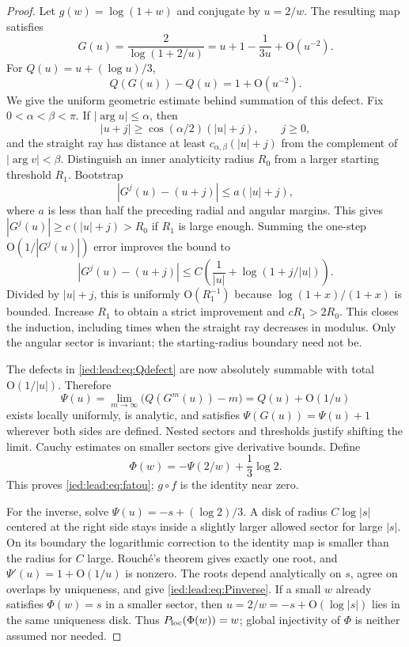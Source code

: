 \documentclass[11pt,letterpaper]{article}
\theoremstyle{remark}\newtheorem{remark}[theorem]{Remark}
\newcommand{\Oh}{\mathrm O}\newcommand{\supp}{\operatorname{supp}}
\begin{document}
\begin{proof}
Let $g(w)=\log(1+w)$ and conjugate by $u=2/w$. The resulting map satisfies
\[
 G(u)=\frac2{\log(1+2/u)}=u+1-\frac1{3u}+\Oh(u^{-2}).
\]
For $Q(u)=u+(\log u)/3$,
\begin{equation}\label{ied:lead:eq:Qdefect}
 Q(G(u))-Q(u)=1+\Oh(u^{-2}).
\end{equation}
We give the uniform geometric estimate behind summation of this defect. Fix $0<\alpha<\beta<\pi$. If $|\arg u|\le\alpha$, then
\[
 |u+j|\ge\cos(\alpha/2)(|u|+j),\qquad j\ge0,
\]
and the straight ray has distance at least $c_{\alpha,\beta}(|u|+j)$ from the complement of $|\arg v|<\beta$. Distinguish an inner analyticity radius $R_0$ from a larger starting threshold $R_1$. Bootstrap
\[
 |G^j(u)-(u+j)|\le a(|u|+j),
\]
where $a$ is less than half the preceding radial and angular margins. This gives $|G^j(u)|\ge c(|u|+j)>R_0$ if $R_1$ is large enough. Summing the one-step $\Oh(1/|G^j(u)|)$ error improves the bound to
\[
 |G^j(u)-(u+j)|\le C\left(\frac1{|u|}+\log(1+j/|u|)\right).
\]
Divided by $|u|+j$, this is uniformly $\Oh(R_1^{-1})$ because $\log(1+x)/(1+x)$ is bounded. Increase $R_1$ to obtain a strict improvement and $cR_1>2R_0$. This closes the induction, including times when the straight ray decreases in modulus. Only the angular sector is invariant; the starting-radius boundary need not be.

The defects in \eqref{ied:lead:eq:Qdefect} are now absolutely summable with total $\Oh(1/|u|)$. Therefore
\[
 \Psi(u)=\lim_{m\to\infty}\bigl(Q(G^m(u))-m\bigr)
 =Q(u)+\Oh(1/u)
\]
exists locally uniformly, is analytic, and satisfies $\Psi(G(u))=\Psi(u)+1$ wherever both sides are defined. Nested sectors and thresholds justify shifting the limit. Cauchy estimates on smaller sectors give derivative bounds. Define
\[
 \Phi(w)=-\Psi(2/w)+\frac13\log2.
\]
This proves \eqref{ied:lead:eq:fatou}; $g\circ f$ is the identity near zero.

For the inverse, solve $\Psi(u)=-s+(\log2)/3$. A disk of radius $C\log|s|$ centered at the right side stays inside a slightly larger allowed sector for large $|s|$. On its boundary the logarithmic correction to the identity map is smaller than the radius for $C$ large. Rouch\'e's theorem gives exactly one root, and $\Psi'(u)=1+\Oh(1/u)$ is nonzero. The roots depend analytically on $s$, agree on overlaps by uniqueness, and give \eqref{ied:lead:eq:Pinverse}. If a small $w$ already satisfies $\Phi(w)=s$ in a smaller sector, then $u=2/w=-s+\Oh(\log|s|)$ lies in the same uniqueness disk. Thus $P_{\rm loc}(\Phi(w))=w$; global injectivity of $\Phi$ is neither assumed nor needed.


\end{proof}
\end{document}
